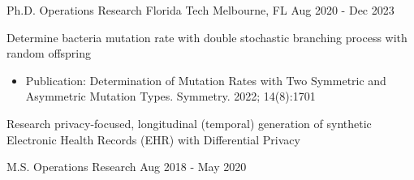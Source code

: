 
\begin{cventries}
	\cventry
	{Ph.D. Operations Research}
	{Florida Tech}
	{Melbourne, FL}
	{Aug 2020 - Dec 2023}
	{\begin{cvitems}
			\item {Determine bacteria mutation rate with double stochastic branching process with random offspring
			            \begin{itemize}
				            \item {Publication: Determination of Mutation Rates with Two Symmetric and Asymmetric Mutation Types. Symmetry. 2022; 14(8):1701}
			            \end{itemize}}
			\item {Research privacy-focused, longitudinal (temporal) generation of synthetic Electronic Health Records (EHR) with Differential Privacy}
		\end{cvitems}}

	\vspace{-2mm}

	\cventry
	{M.S. Operations Research}
	{}
	{}
	{Aug 2018 - May 2020}
	{}
	\vspace{-6.5mm}


\end{cventries}